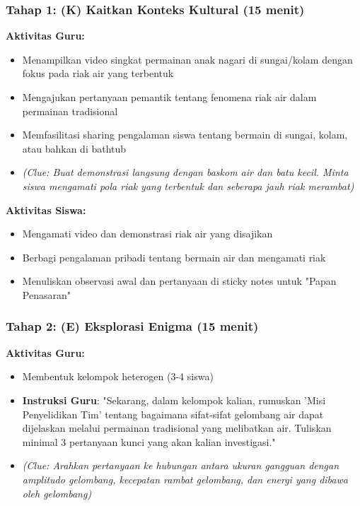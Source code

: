 \documentclass[12pt,a4paper]{article}
\begin{document}
\subsubsection{Tahap 1: (K) Kaitkan Konteks Kultural (15 menit)}

\textbf{Aktivitas Guru:}
\begin{itemize}
\item Menampilkan video singkat permainan anak nagari di sungai/kolam dengan fokus pada riak air yang terbentuk
\item Mengajukan pertanyaan pemantik tentang fenomena riak air dalam permainan tradisional
\item Memfasilitasi sharing pengalaman siswa tentang bermain di sungai, kolam, atau bahkan di bathtub
\item \textit{(Clue: Buat demonstrasi langsung dengan baskom air dan batu kecil. Minta siswa mengamati pola riak yang terbentuk dan seberapa jauh riak merambat)}
\end{itemize}

\textbf{Aktivitas Siswa:}
\begin{itemize}
\item Mengamati video dan demonstrasi riak air yang disajikan
\item Berbagi pengalaman pribadi tentang bermain air dan mengamati riak
\item Menuliskan observasi awal dan pertanyaan di sticky notes untuk "Papan Penasaran"
\end{itemize}

\subsubsection{Tahap 2: (E) Eksplorasi Enigma (15 menit)}

\textbf{Aktivitas Guru:}
\begin{itemize}
\item Membentuk kelompok heterogen (3-4 siswa)
\item \textbf{Instruksi Guru}: "Sekarang, dalam kelompok kalian, rumuskan 'Misi Penyelidikan Tim' tentang bagaimana sifat-sifat gelombang air dapat dijelaskan melalui permainan tradisional yang melibatkan air. Tuliskan minimal 3 pertanyaan kunci yang akan kalian investigasi."
\item \textit{(Clue: Arahkan pertanyaan ke hubungan antara ukuran gangguan dengan amplitudo gelombang, kecepatan rambat gelombang, dan energi yang dibawa oleh gelombang)}
\end{itemize}
\end{document}
